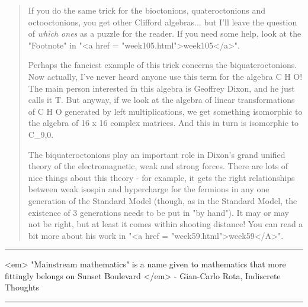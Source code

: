 \begin{quote}
If you do the same trick for the bioctonions, quateroctonions and
octooctonions, you get other Clifford algebras... but I'll leave 
the question of \emph{which ones} as a puzzle for the reader.  If you
need some help, look at the "Footnote" in "<a href = "week105.html">week105</a>".

Perhaps the fanciest example of this trick concerns the biquateroctonions.  
Now actually, I've never heard anyone use this term for the algebra 
C \otimes  H \otimes  O!  The main person interested in this algebra is 
Geoffrey Dixon, and he just calls it T.  But anyway, if we look at 
the algebra of linear transformations of C \otimes  H \otimes  O generated 
by left multiplications, we get something isomorphic to the algebra of 
16 x 16 complex matrices.  And this in turn is isomorphic to C_{9,0}.

The biquateroctonions play an important role in Dixon's grand unified 
theory of the electromagnetic, weak and strong forces.  There are lots 
of nice things about this theory - for example, it gets the right 
relationships between weak isospin and hypercharge for the fermions in 
any one generation of the Standard Model (though, as in the Standard 
Model, the existence of 3 generations needs to be put in "by hand").  
It may or may not be right, but at least it comes within shooting distance!  
You can read a bit more about his work in "<a href = "week59.html">week59</A>".
\end{quote}


 \par\noindent\rule{\textwidth}{0.4pt}
<em> "Mainstream mathematics" is a name given to mathematics that 
more fittingly belongs on Sunset Boulevard </em> - Gian-Carlo Rota, Indiscrete 
Thoughts


\par\noindent\rule{\textwidth}{0.4pt}

